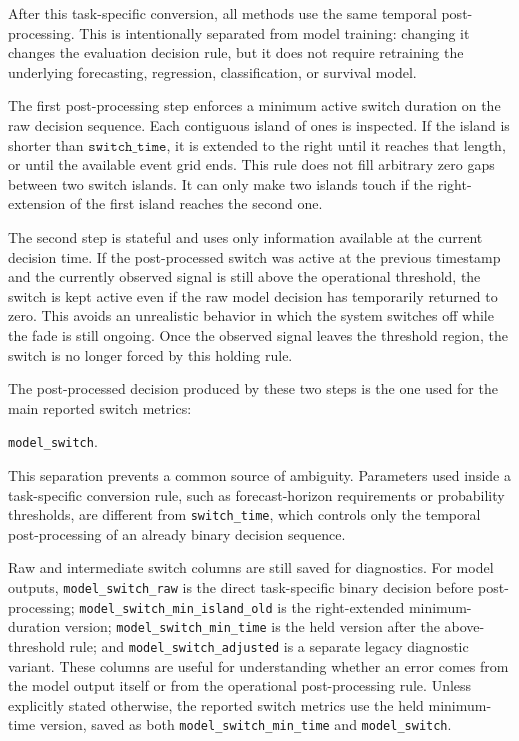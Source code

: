 After this task-specific conversion, all methods use the same temporal
post-processing. This is intentionally separated from model training: changing
it changes the evaluation decision rule, but it does not require retraining the
underlying forecasting, regression, classification, or survival model.

The first post-processing step enforces a minimum active switch duration on the
raw decision sequence. Each contiguous island of ones is inspected. If the
island is shorter than \(\texttt{switch\_time}\), it is extended to the right
until it reaches that length, or until the available event grid ends. This rule
does not fill arbitrary zero gaps between two switch islands. It can only make
two islands touch if the right-extension of the first island reaches the second
one.

The second step is stateful and uses only information available at the current
decision time. If the post-processed switch was active at the previous timestamp
and the currently observed signal is still above the operational threshold, the
switch is kept active even if the raw model decision has temporarily returned to
zero. This avoids an unrealistic behavior in which the system switches off
while the fade is still ongoing. Once the observed signal leaves the threshold
region, the switch is no longer forced by this holding rule.

The post-processed decision produced by these two steps is the one used for the
main reported switch metrics:

\begin{center}
\texttt{model\_switch}.
\end{center}

This separation prevents a common source of ambiguity. Parameters used inside a
task-specific conversion rule, such as forecast-horizon requirements or
probability thresholds, are different from \texttt{switch\_time}, which controls
only the temporal post-processing of an already binary decision sequence.

Raw and intermediate switch columns are still saved for diagnostics. For model
outputs, \texttt{model\_switch\_raw} is the direct task-specific binary
decision before post-processing; \texttt{model\_switch\_min\_island\_old} is
the right-extended minimum-duration version; \texttt{model\_switch\_min\_time}
is the held version after the above-threshold rule; and
\texttt{model\_switch\_adjusted} is a separate legacy diagnostic variant. These
columns are useful for understanding whether an error comes from the model
output itself or from the operational post-processing rule. Unless explicitly
stated otherwise, the reported switch metrics use the held minimum-time version,
saved as both \texttt{model\_switch\_min\_time} and \texttt{model\_switch}.

